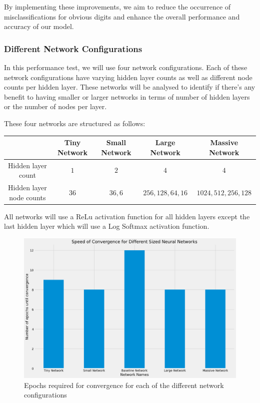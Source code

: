 \documentclass[a4paper,twoside,10pt]{article}
\begin{document}
By implementing these improvements, we aim to reduce the occurrence of misclassifications for obvious digits and enhance the overall performance and accuracy of our model.

\subsubsection{Different Network Configurations}
In this performance test, we will use four network configurations. Each of these network configurations have varying hidden layer counts as well as different node counts per hidden layer. These networks will be analysed to identify if there's any benefit to having smaller or larger networks in terms of number of hidden layers or the number of nodes per layer.

These four networks are structured as follows:
\begin{table}[H]
    \centering
    \begin{tabular}{||c|c|c|c|c||}
    \hline
    & Tiny Network & Small Network & Large Network & Massive Network \\
    \hline
    \hline
    Hidden layer count & $1$ & $2$ & $4$ & $4$ \\
    \hline
    Hidden layer node counts & $36$ & $36, 6$ & $256, 128, 64, 16$ & $1024, 512, 256, 128$ \\
    \hline
    \end{tabular}
\end{table}

All networks will use a ReLu activation function for all hidden layers except the last hidden layer which will use a Log Softmax activation function.

\begin{figure}[H]
    \centering
    \includegraphics[scale=0.3]{Convergence NN}
    \caption{Epochs required for convergence for each of the different network configurations}
    \label{fig:nn_convergence}
\end{figure}
\end{document}
